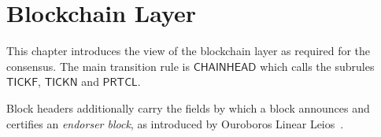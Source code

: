 \section{Blockchain Layer}
\label{sec:blockchain}

This chapter introduces the view of the blockchain layer as required for the
consensus. The main transition rule is $\mathsf{CHAINHEAD}$ which calls the subrules
$\mathsf{TICKF}$, $\mathsf{TICKN}$ and $\mathsf{PRTCL}$.

Block headers additionally carry the fields by which a block announces and certifies
an \emph{endorser block}, as introduced by Ouroboros Linear Leios~\cite{cip_164}.



\clearpage



\clearpage



\clearpage



\clearpage



\clearpage



\clearpage


